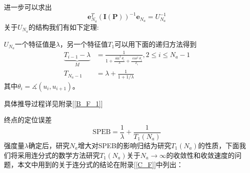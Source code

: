 进一步可以求出
\begin{equation}\label{eq:thomas_final}
\bm{e}_{N_a}^T(\bm{I}(\bm{P}))^{-1}\bm{e}_{N_a}=U_{N_a}^{-1}
\end{equation}
关于$U_{N_a}$的结构我们有如下定理:
\begin{theorem}
$U_{N_a}$一个特征值是$\lambda$，另一个特征值$T_1$可以用下面的递归方法得到
\begin{equation}\label{eq:recursive_efim}
\begin{split}
\underbrace{T_{i-1}-\lambda}_{M} & =\frac{1}{1+\frac{\sin^2\theta_i}{\lambda}+\frac{\cos^2\theta_i}{T_i}},2\leq i\leq N_a-1\\
T_{N_a-1} & = \lambda+\frac{1}{1+1/\lambda}
\end{split}
\end{equation}
其中$\theta_i=\measuredangle (u_i,u_{i+1})$。
\end{theorem}
具体推导过程详见附录[\ref{B_F_1}]
\begin{remark}
终点的定位误差
\begin{equation}\label{eq:final_speb}
\text{SPEB}=\frac{1}{\lambda}+\frac{1}{T_1(N_a)}
\end{equation}
强度量$\lambda$确定后，研究$N_a$增大对SPEB的影响归结为研究$T_1(N_a)$的性质，下面我们将采用连分式的数学方法研究$T_1(N_a)$关于$N_a\to \infty$的收敛性和收敛速度的问题，本文中用到的关于连分式的结论在附录[\ref{C_F}]中列出\cite{ContinuedFraction}：
\end{remark}
